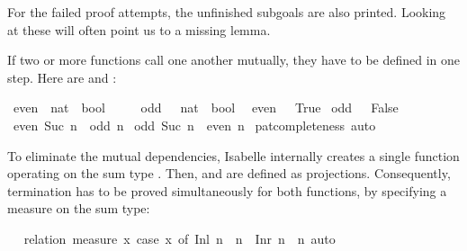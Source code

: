 \begin{isabellebody}
\begin{isamarkuptext}
  For the failed proof attempts, the unfinished subgoals are also
  printed. Looking at these will often point us to a missing lemma.

\end{isamarkuptext}%
\isamarkuptrue%
%
\isamarkuptrue%
%
\begin{isamarkuptext}%
If two or more functions call one another mutually, they have to be defined
  in one step. Here are  and :%
\end{isamarkuptext}%
\isamarkuptrue%
\isamarkupfalse%
\ even\ {\isacharcolon}{\isacharcolon}\ {\isachardoublequoteopen}nat\ {\isasymRightarrow}\ bool{\isachardoublequoteclose}\isanewline
\ \ \ \ \ odd\ \ {\isacharcolon}{\isacharcolon}\ {\isachardoublequoteopen}nat\ {\isasymRightarrow}\ bool{\isachardoublequoteclose}\isanewline
{}\isanewline
\ \ {\isachardoublequoteopen}even\ {}\ {\isacharequal}\ True{\isachardoublequoteclose}\isanewline
{\isacharbar}\ {\isachardoublequoteopen}odd\ {}\ {\isacharequal}\ False{\isachardoublequoteclose}\isanewline
{\isacharbar}\ {\isachardoublequoteopen}even\ {\isacharparenleft}Suc\ n{\isacharparenright}\ {\isacharequal}\ odd\ n{\isachardoublequoteclose}\isanewline
{\isacharbar}\ {\isachardoublequoteopen}odd\ {\isacharparenleft}Suc\ n{\isacharparenright}\ {\isacharequal}\ even\ n{\isachardoublequoteclose}\isanewline
%
\isadelimproof
%
\endisadelimproof
%
\isatagproof
{}\isamarkupfalse%
\ pat{\isacharunderscore}completeness\ auto%
\endisatagproof
{\isafoldproof}%
%
\isadelimproof
%
\endisadelimproof
%
\begin{isamarkuptext}%
To eliminate the mutual dependencies, Isabelle internally
  creates a single function operating on the sum
  type . Then,  and  are
  defined as projections. Consequently, termination has to be proved
  simultaneously for both functions, by specifying a measure on the
  sum type:%
\end{isamarkuptext}%
\isamarkuptrue%
\isamarkupfalse%
\ \isanewline
%
\isadelimproof
%
\endisadelimproof
%
\isatagproof
{}\isamarkupfalse%
\ {\isacharparenleft}relation\ {\isachardoublequoteopen}measure\ {\isacharparenleft}{\isasymlambda}x{\isachardot}\ case\ x\ of\ Inl\ n\ {\isasymRightarrow}\ n\ {\isacharbar}\ Inr\ n\ {\isasymRightarrow}\ n{\isacharparenright}{\isachardoublequoteclose}{\isacharparenright}\ auto%

\end{isabellebody}
